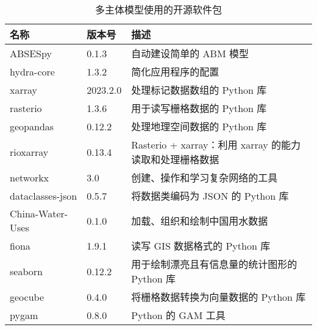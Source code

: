 \begin{table}[htbp]
    \centering
    \caption{多主体模型使用的开源软件包}
      \begin{tabularx}{0.9\textwidth}{p{2cm} p{1.5cm} L}
        \toprule
      名称    & 版本号   & 描述 \\
      \midrule
      ABSESpy & 0.1.3 & 自动建设简单的 ABM 模型 \\
      hydra-core & 1.3.2 & 简化应用程序的配置 \\
      xarray & 2023.2.0 & 处理标记数据数组的 Python 库 \\
      rasterio & 1.3.6 & 用于读写栅格数据的 Python 库 \\
      geopandas & 0.12.2 & 处理地理空间数据的 Python 库 \\
      rioxarray & 0.13.4 & Rasterio + xarray：利用 xarray 的能力读取和处理栅格数据 \\
      networkx & 3.0 & 创建、操作和学习复杂网络的工具 \\
      dataclasses-json & 0.5.7 & 将数据类编码为 JSON 的 Python 库 \\
      China-Water-Uses & 0.1.0 & 加载、组织和绘制中国用水数据 \\
      fiona & 1.9.1 & 读写 GIS 数据格式的 Python 库 \\
      seaborn & 0.12.2 & 用于绘制漂亮且有信息量的统计图形的 Python 库 \\
      geocube & 0.4.0 & 将栅格数据转换为向量数据的 Python 库 \\
      pygam & 0.8.0 & Python 的 GAM 工具 \\
      \bottomrule
      \end{tabularx}%
    \label{ch6:tab:packages}%
  \end{table}%
  